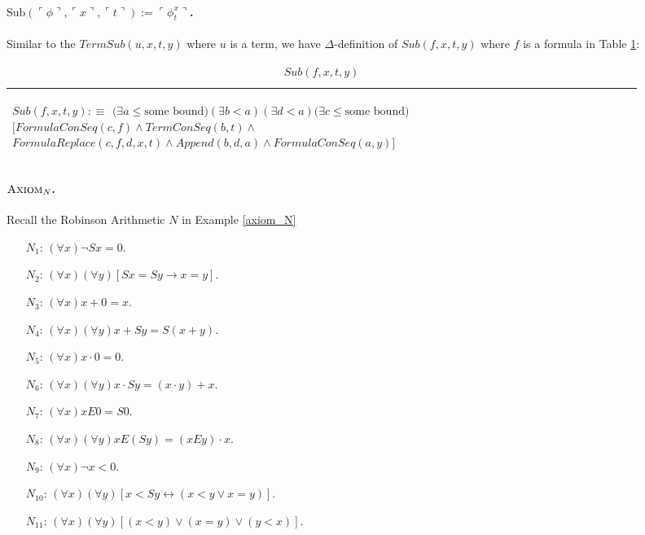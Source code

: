 \documentclass[11pt,letterpaper]{book}
\theoremstyle{definition}
\begin{document}
\paragraph{$\text{Sub}(  \ulcorner \phi \urcorner,  \ulcorner x \urcorner,  \ulcorner t \urcorner ) :=  \ulcorner \phi_t ^x \urcorner $.}

Similar to the $TermSub(u, x, t, y)$ where $u$ is a term, we have $\Delta$-definition of $Sub(f, x, t, y)$ where $f$ is a formula in Table \ref{box:formula_sub}:


\begin{table}[h]
\caption{$Sub(f, x, t, y)$}
\label{box:formula_sub}
\begin{tabular}{|p{0.9\linewidth}|}
\hline
\rule{0pt}{3ex}
\begin{center}
$Sub(f, x, t, y) : \equiv $
$ \bigg( \exists a \leq \text{some bound} \bigg) (\exists b < a) (\exists d < a) \bigg( \exists c \leq \text{some bound} \bigg)  $
$ \bigg[ FormulaConSeq(c, f) \land TermConSeq(b, t) \land $
$FormulaReplace(c, f, d, x, t) \land Append(b, d, a) \land FormulaConSeq(a, y) \bigg] $
\end{center}\\
\hline
\end{tabular}
\end{table}


\paragraph{$\text{\textsc{Axiom}}_N$. }

Recall the Robinson Arithmetic $N$ in Example \ref{axiom_N}

\begin{enumerate}
\item[$N_1$: ]{$ (\forall x) \lnot S x = 0$.}
\item[$N_2$: ]{$ (\forall x)(\forall y) [Sx = Sy \rightarrow x = y] $.}
\item[$N_3$: ]{$ (\forall x) x + 0 = x $.}
\item[$N_4$: ]{$ (\forall x)(\forall y)x + Sy = S(x+y) $.}
\item[$N_5$: ]{$ (\forall x) x \cdot 0 = 0 $.}
\item[$N_6$: ]{$ (\forall x)(\forall y) x \cdot Sy = (x \cdot y) + x $.}
\item[$N_7$: ]{$ (\forall x) x E 0 = S 0 $.}
\item[$N_8$: ]{$ (\forall x)(\forall y) x E (S y) = (x E y) \cdot x $.}
\item[$N_9$: ]{$ (\forall x) \lnot x < 0 $.}
\item[$N_{10}$: ]{$ (\forall x)(\forall y) [x < Sy \leftrightarrow (x < y \lor x = y
)] $.}
\item[$N_{11}$: ]{$ (\forall x)(\forall y) [(x<y) \lor (x = y) \lor (y < x) ] $.}
\end{enumerate}
\end{document}
